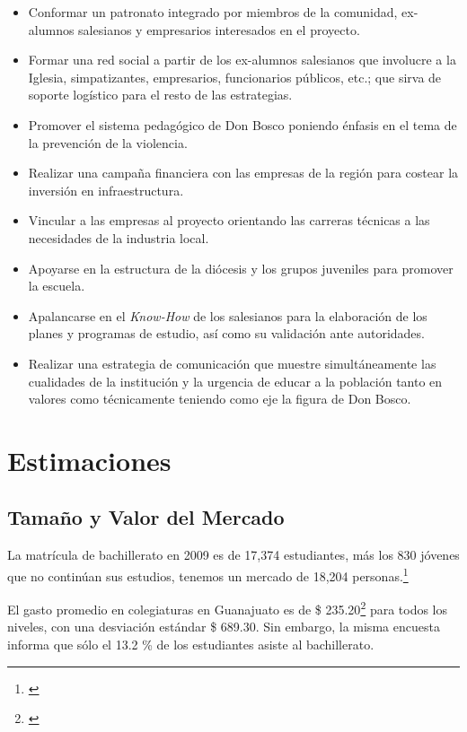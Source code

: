 \begin{itemize}
	\item Conformar un patronato integrado por miembros de la comunidad, ex-alumnos salesianos y empresarios interesados en el proyecto.
	\item Formar una red social a partir de los ex-alumnos salesianos que involucre a la Iglesia, simpatizantes, empresarios, funcionarios públicos, etc.; que sirva de soporte logístico para el resto de las estrategias.
	\item Promover el sistema pedagógico de Don Bosco poniendo énfasis en el tema de la prevención de la violencia.
	\item Realizar una campaña financiera con las empresas de la región para costear la inversión en infraestructura.
	\item Vincular a las empresas al proyecto orientando las carreras técnicas a las necesidades de la industria local.
	\item Apoyarse en la estructura de la diócesis y los grupos juveniles para promover la escuela.
	\item Apalancarse en el \emph{Know-How} de los salesianos para la elaboración de los planes y programas de estudio, así como su validación ante autoridades.
	\item Realizar una estrategia de comunicación que muestre simultáneamente las cualidades de la institución y la urgencia de educar a la población tanto en valores como técnicamente teniendo como eje la figura de Don Bosco.
\end{itemize}

\clearpage

\section{Estimaciones}
\label{sec:Neg:Estimaciones}

\subsection{Tamaño y Valor del Mercado}

La matrícula de bachillerato en 2009 es de 17,374 estudiantes, más los 830 jóvenes que no continúan sus estudios, tenemos un mercado de 18,204 personas.\footnote{\citep{Seg2010}}

El gasto promedio en colegiaturas en Guanajuato es de \$ 235.20\footnote{\citep{INEGI-2009-DGES-003}} para todos los niveles, con una desviación estándar \$ 689.30. Sin embargo, la misma encuesta informa que sólo el 13.2 \% de los estudiantes asiste al bachillerato.

